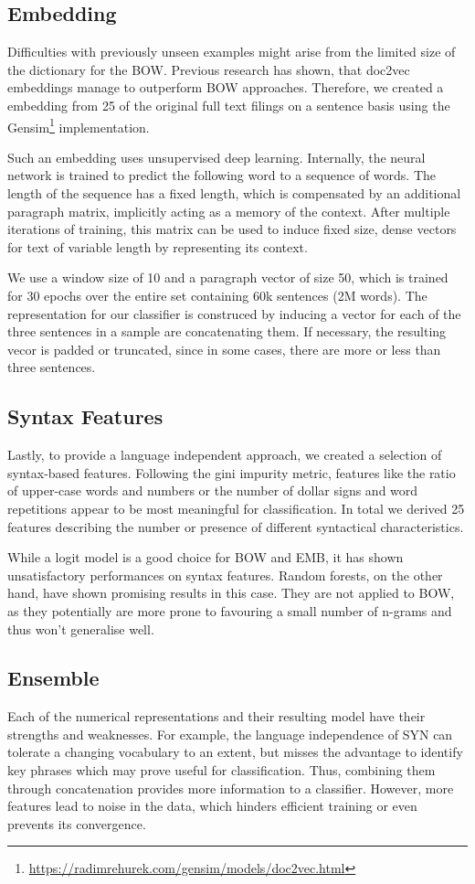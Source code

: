 \subsection{Embedding}
Difficulties with previously unseen examples might arise from the limited size of the dictionary for the BOW.
Previous research has shown, that doc2vec embeddings manage to outperform BOW approaches.
Therefore, we created a embedding from 25 of the original full text filings on a sentence basis using the Gensim\footnote{\url{https://radimrehurek.com/gensim/models/doc2vec.html}} implementation.

Such an embedding uses unsupervised deep learning. 
Internally, the neural network is trained to predict the following word to a sequence of words. 
The length of the sequence has a fixed length, which is compensated by an additional paragraph matrix, implicitly acting as a memory of the context.
After multiple iterations of training, this matrix can be used to induce fixed size, dense vectors for text of variable length by representing its context.

We use a window size of 10 and a paragraph vector of size 50, which is trained for 30 epochs over the entire set containing 60k sentences (2M words).
The representation for our classifier is construced by inducing a vector for each of the three sentences in a sample are concatenating them. If necessary, the resulting vecor is padded or truncated, since in some cases, there are more or less than three sentences.

\subsection{Syntax Features}
Lastly, to provide a language independent approach, we created a selection of syntax-based features.
Following the gini impurity metric, features like the ratio of upper-case words and numbers or the number of dollar signs and word repetitions appear to be most meaningful for classification.
In total we derived 25 features describing the number or presence of different syntactical characteristics.

While a logit model is a good choice for BOW and EMB, it has shown unsatisfactory performances on syntax features.
Random forests, on the other hand, have shown promising results in this case.
They are not applied to BOW, as they potentially are more prone to favouring a small number of n-grams and thus won't generalise well.

\subsection{Ensemble}
Each of the numerical representations and their resulting model have their strengths and weaknesses.
For example, the language independence of SYN can tolerate a changing vocabulary to an extent, but misses the advantage to identify key phrases which may prove useful for classification.
Thus, combining them through concatenation provides more information to a classifier.
However, more features lead to noise in the data, which hinders efficient training or even prevents its convergence.

